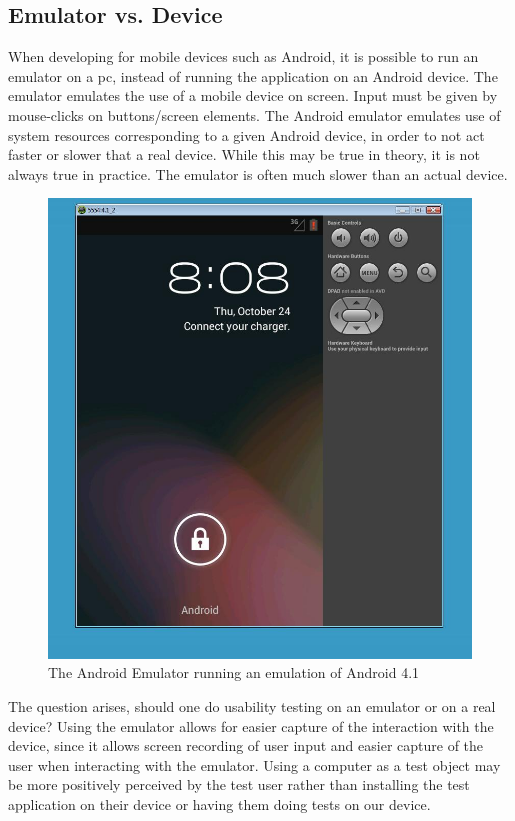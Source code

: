 \subsection{Emulator vs. Device}
When developing for mobile devices such as Android, it is possible to run an emulator on a pc, instead of running the application on an Android device. The emulator emulates the use of a mobile device on screen. Input must be given by mouse-clicks on buttons/screen elements. The Android emulator emulates use of system resources corresponding to a given Android device, in order to not act faster or slower that a real device. While this may be true in theory, it is not always true in practice. The emulator is often much slower than an actual device.


\begin{figure}
\begin{center}
\includegraphics[scale=0.4]{Pictures/app-screenshots/androidemulator.png}
\end{center}
\caption{The Android Emulator running an emulation of Android 4.1}
\label{fig:androidemulator}
\end{figure}

The question arises, should one do usability testing on an emulator or on a real device?
Using the emulator allows for easier capture of the interaction with the device, since it allows screen recording of user input and easier capture of the user when interacting with the emulator. Using a computer as a test object may be more positively perceived by the test user rather than installing the test application on their device or having them doing tests on our device. 

